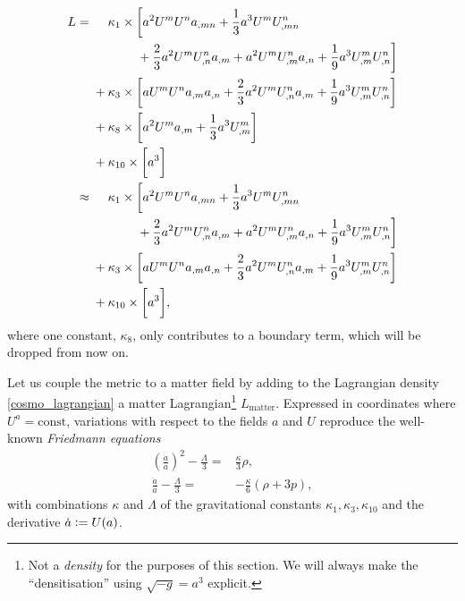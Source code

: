 \begin{equation}\label{cosmo_lagrangian}
  \begin{aligned}
    L = {} & \mathbin{\hphantom{+}} \kappa_1 \times \bigg\lbrack a^2 U^m U^n a_{,mn} + \frac{1}{3} a^3 U^m U^n_{,mn} \\ {} & \hphantom{+ \kappa_1 \times \bigg\lbrack } + \frac{2}{3} a^2 U^m U^n_{,n} a_{,m} + a^2 U^m U^n_{,m} a_{,n} + \frac{1}{9} a^3 U^m_{,m} U^n_{,n} \bigg\rbrack \\
    {} & + \kappa_3 \times \bigg\lbrack a U^m U^n a_{,m} a_{,n} + \frac{2}{3} a^2 U^m U^n_{,n} a_{,m} + \frac{1}{9} a^3 U^m_{,m} U^n_{,n}\bigg\rbrack \\
    {} & + \kappa_8 \times \bigg\lbrack a^2 U^m a_{,m} + \frac{1}{3} a^3 U^m_{,m} \bigg\rbrack \\
    {} & + \kappa_{10} \times \bigg\lbrack a^3 \bigg\rbrack \\
    \approx {} & \mathbin{\hphantom{+}} \kappa_1 \times \bigg\lbrack a^2 U^m U^n a_{,mn} + \frac{1}{3} a^3 U^m U^n_{,mn} \\ {} & \hphantom{+ \kappa_1 \times \bigg\lbrack } + \frac{2}{3} a^2 U^m U^n_{,n} a_{,m} + a^2 U^m U^n_{,m} a_{,n} + \frac{1}{9} a^3 U^m_{,m} U^n_{,n} \bigg\rbrack \\
    {} & + \kappa_3 \times \bigg\lbrack a U^m U^n a_{,m} a_{,n} + \frac{2}{3} a^2 U^m U^n_{,n} a_{,m} + \frac{1}{9} a^3 U^m_{,m} U^n_{,n}\bigg\rbrack \\
    {} & + \kappa_{10} \times \bigg\lbrack a^3 \bigg\rbrack,
  \end{aligned}
\end{equation}
where one constant, $\kappa_8$, only contributes to a boundary term, which will be dropped from now on.

Let us couple the metric to a matter field by adding to the Lagrangian density \eqref{cosmo_lagrangian} a matter Lagrangian\footnote{Not a \emph{density} for the purposes of this section. We will always make the ``densitisation'' using $\sqrt{-g} = a^3$ explicit.} $L_\text{matter}$. Expressed in coordinates where $U^a = \text{const}$, variations with respect to the fields $a$ and $U$ reproduce the well-known \emph{Friedmann equations} \cite{Friedman_1922}
\begin{align}
  \left(\frac{\dot a}{a}\right)^2 - \frac{\Lambda}{3} = {} & \frac{\kappa}{3} \rho, \label{friedmann_1}\\
  \frac{\ddot a}{a} - \frac{\Lambda}{3} = {} & -\frac{\kappa}{6}(\rho + 3 p), \label{friedmann_2}
\end{align}
with combinations $\kappa$ and $\Lambda$ of the gravitational constants $\kappa_1,\kappa_3,\kappa_{10}$ and the derivative $\dot a \vcentcolon= U(a)$.

